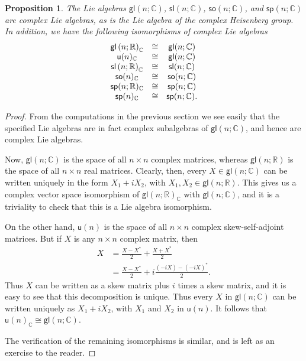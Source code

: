 \documentclass{amsbook}
\theoremstyle{plain}
\newtheorem{proposition}[theorem]{Proposition}
\numberwithin{equation}{chapter}
\numberwithin{theorem}{chapter}
\begin{document}
\begin{proposition}
\label{complex.classical}The Lie algebras $\mathsf{gl}(n;\mathbb{C})$,
$\mathsf{sl}(n;\mathbb{C})$, $\mathsf{so}(n;\mathbb{C})$, and $\mathsf{sp}%
(n;\mathbb{C})$ are complex Lie algebras, as is the Lie algebra of the complex
Heisenberg group. In addition, we have the following isomorphisms of complex
Lie algebras
\[%
\begin{array}
[c]{ccc}%
\mathsf{gl}\left(  n;\mathbb{R}\right)  _{\mathbb{C}} & \cong & \mathsf{gl}%
(n;\mathbb{C})\\
\mathsf{u}(n)_{\mathbb{C}} & \cong & \mathsf{gl}(n;\mathbb{C})\\
\mathsf{sl}\left(  n;\mathbb{R}\right)  _{\mathbb{C}} & \cong & \mathsf{sl}%
(n;\mathbb{C})\\
\mathsf{so}(n)_{\mathbb{C}} & \cong & \mathsf{so}(n;\mathbb{C})\\
\mathsf{sp}(n;\mathbb{R})_{\mathbb{C}} & \cong & \mathsf{sp}(n;\mathbb{C})\\
\mathsf{sp}(n)_{\mathbb{C}} & \cong & \mathsf{sp}(n;\mathbb{C})\text{.}%
\end{array}
\]
\end{proposition}

\begin{proof}
From the computations in the previous section we see easily that the specified
Lie algebras are in fact complex subalgebras of $\mathsf{gl}(n;\mathbb{C})$,
and hence are complex Lie algebras.

Now, $\mathsf{gl}(n;\mathbb{C})$ is the space of all $n\times n$ complex
matrices, whereas $\mathsf{gl}\left(  n;\mathbb{R}\right)  $ is the space of
all $n\times n$ real matrices. Clearly, then, every $X\in\mathsf{gl}\left(
n;\mathbb{C}\right)  $ can be written uniquely in the form $X_{1}+iX_{2}$,
with $X_{1},X_{2}\in\mathsf{gl}\left(  n;\mathbb{R}\right)  $. This gives us a
complex vector space isomorphism of $\mathsf{gl}\left(  n;\mathbb{R}\right)
_{\mathbb{C}}$ with $\mathsf{gl}(n;\mathbb{C})$, and it is a triviality to
check that this is a Lie algebra isomorphism.

On the other hand, $\mathsf{u}(n)$ is the space of all $n\times n$ complex
skew-self-adjoint matrices. But if $X$ is any $n\times n$ complex matrix,
then
\begin{align*}
X  & =\frac{X-X^{\ast}}{2}+\frac{X+X^{\ast}}{2}\\
& =\frac{X-X^{\ast}}{2}+i\frac{(-iX)-(-iX)^{\ast}}{2}\text{.}%
\end{align*}
Thus $X$ can be written as a skew matrix plus $i$ times a skew matrix, and it
is easy to see that this decomposition is unique. Thus every $X$ in
$\mathsf{gl}(n;\mathbb{C})$ can be written uniquely as $X_{1}+iX_{2}$, with
$X_{1}$ and $X_{2}$ in $\mathsf{u}(n)$. It follows that $\mathsf{u}%
(n)_{\mathbb{C}}\cong\mathsf{gl}(n;\mathbb{C})$.

The verification of the remaining isomorphisms is similar, and is left as an
exercise to the reader.
\end{proof}
\end{document}
